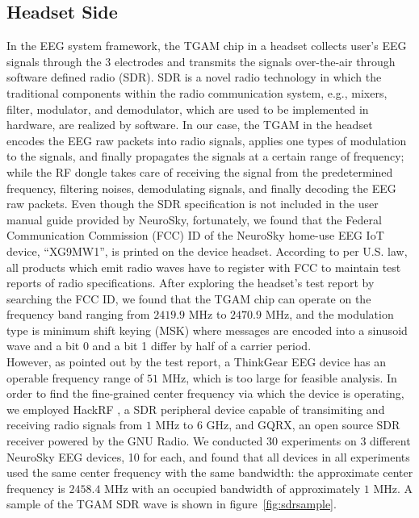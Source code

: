 \subsection{Headset Side}
In the EEG system framework, the TGAM chip in a headset collects user's EEG signals through the 3 electrodes and transmits the signals over-the-air through software defined radio (SDR). SDR is a novel radio technology in which the traditional components within the radio communication system, e.g., mixers, filter, modulator, and demodulator, which are used to be implemented in hardware, are realized by software. In our case, the TGAM in the headset encodes the EEG raw packets into radio signals, applies one types of modulation to the signals, and finally propagates the signals at a certain range of frequency; while the RF dongle takes care of receiving the signal from the predetermined frequency, filtering noises, demodulating signals, and finally decoding the EEG raw packets. Even though the SDR specification is not included in the user manual guide provided by NeuroSky, fortunately, we found that the Federal Communication Commission (FCC) ID of the NeuroSky home-use EEG IoT device, ``XG9MW1'', is printed on the device headset. According to per U.S. law, all products which emit radio waves have to register with FCC to maintain test reports of radio specifications. After exploring the headset's test report \cite{testreport} by searching the FCC ID, we found that the TGAM chip can operate on the frequency band ranging from $2419.9$ MHz to $2470.9$ MHz, and the modulation type is minimum shift keying (MSK) where messages are encoded into a sinusoid wave and a bit 0 and a bit 1 differ by half of a carrier period. %
\\
%
\indent However, as pointed out by the test report, a ThinkGear EEG device has an operable frequency range of $51$ MHz, which is too large for feasible analysis. In order to find the fine-grained center frequency via which the device is operating, we employed HackRF \cite{gadgetshackrf}, a SDR peripheral device capable of transimiting and receiving radio signals from $1$ MHz to $6$ GHz, and GQRX\cite{gqrx}, an open source SDR receiver powered by the GNU Radio. We conducted 30 experiments on 3 different NeuroSky EEG devices, 10 for each, and found that all devices in all experiments used the same center frequency with the same bandwidth: the approximate center frequency is $2458.4$ MHz with an occupied bandwidth of approximately $1$ MHz. A sample of the TGAM SDR wave is shown in figure~\ref{fig:sdrsample}.\\
